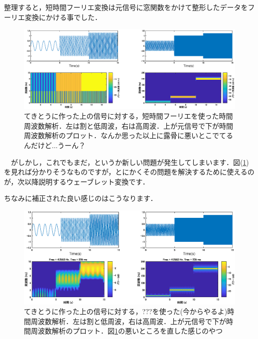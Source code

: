 \documentclass[11pt,a4paper]{ujreport} 	%
\begin{document}
整理すると，短時間フーリエ変換は元信号に窓関数をかけて整形したデータをフーリエ変換にかける事でした．\\

\begin{figure}[H]
  \label{im:tft}
  \centering
  \includegraphics[width=15cm]{../figures/tft.eps}
  \caption{てきとうに作った上の信号に対する，短時間フーリエを使った時間周波数解析．左は割と低周波，右は高周波．上が元信号で下が時間周波数解析のプロット．なんか思った以上に露骨に悪いとこでてるんだけど...うーん？}
\end{figure}

　がしかし，これでもまだ，というか新しい問題が発生してしまいます．図(\ref{im:tft})を見れば分かりそうなものですが，とにかくその問題を解決するために使えるのが，次以降説明するウェーブレット変換です．

ちなみに補正された良い感じのはこうなります．

\begin{figure}[H]
  \label{im:tft2}
  \centering
  \includegraphics[width=15cm]{../figures/tft2.eps}
  \caption{てきとうに作った上の信号に対する，???を使った(今からやるよ)時間周波数解析．左は割と低周波，右は高周波．上が元信号で下が時間周波数解析のプロット．図\ref{im:tft}の悪いところを直した感じのやつ}
\end{figure}
\end{document}
